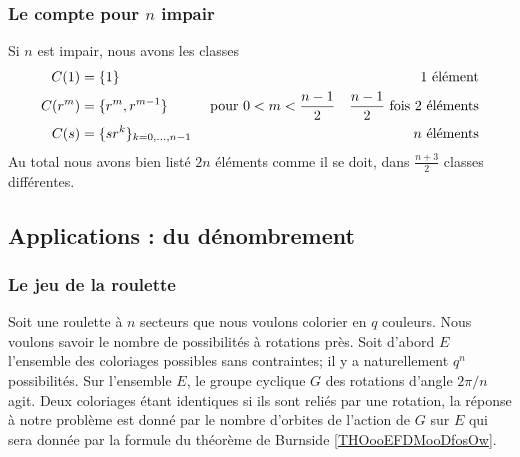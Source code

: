 \subsubsection{Le compte pour $ n$ impair}
\label{Subsubsec*GJIzDEP}

Si \( n\) est impair, nous avons les classes
\begin{subequations}
    \begin{align}
        C(1)&=\{ 1 \}       &&&\text{\( 1\) élément}\\
        C(r^m)&=\{ r^m,r^{m-1} \}&\text{ pour }&0<m<\frac{ n-1 }{2}   &\text{\( \frac{ n-1 }{2}\) fois \( 2\) éléments}\\
        C(s)&=\{ sr^k \}_{k=0,\ldots, n-1} &&& \text{\( n\) éléments}
    \end{align}
\end{subequations}
Au total nous avons bien listé \( 2n\) éléments comme il se doit, dans \(  \frac{ n+3 }{2}\) classes différentes.

\subsection{Applications : du dénombrement}

\subsubsection{Le jeu de la roulette}
\label{pTqJLY}

Soit une roulette à \( n\) secteurs que nous voulons colorier en \( q\) couleurs\cite{HEBOFl}. Nous voulons savoir le nombre de possibilités à rotations près. Soit d'abord \( E\) l'ensemble des coloriages possibles sans contraintes; il y a naturellement \( q^n\) possibilités. Sur l'ensemble \( E\), le groupe cyclique \( G\) des rotations d'angle \( 2\pi/n\) agit. Deux coloriages étant identiques si ils sont reliés par une rotation, la réponse à notre problème est donné par le nombre d'orbites de l'action de \( G\) sur \( E\) qui sera donnée par la formule du théorème de Burnside \ref{THOooEFDMooDfosOw}. 

